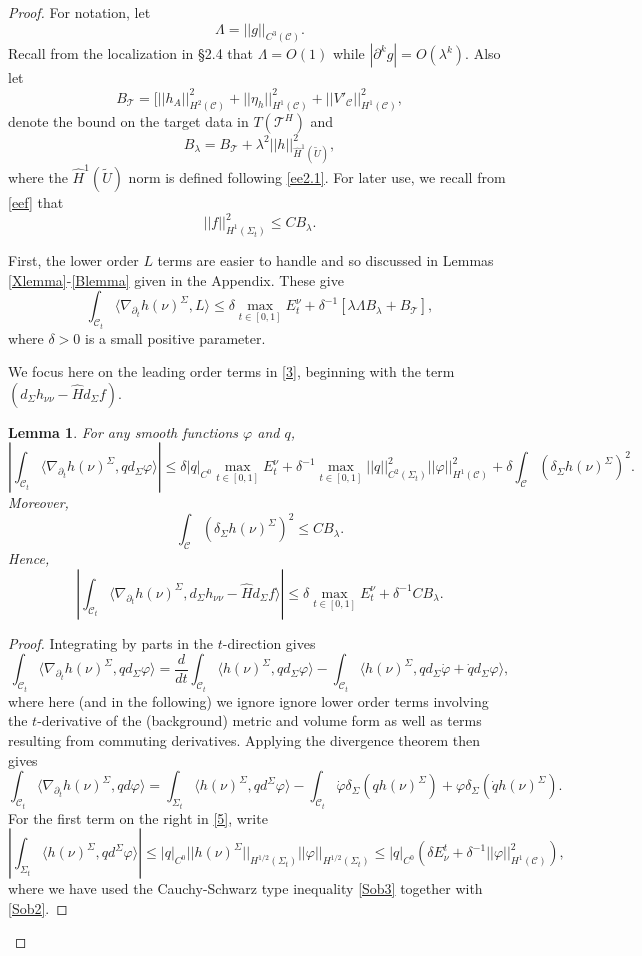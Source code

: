 \documentclass[10pt]{amsart}
\renewcommand{\d}{\delta}
\newcommand{\f}{\varphi}
\newcommand{\Si}{\Sigma}
\renewcommand{\l}{\lambda}
\newcommand{\cC}{{\mathcal C}}
\newcommand{\cT}{{\mathcal T}}
\newcommand{\be}{\begin{equation}}
\newcommand{\ee}{\end{equation}}
\newcommand{\p}{\partial}
\renewcommand{\hat}{\widehat}
\newcommand{\<}{\langle}
\renewcommand{\>}{\rangle}
\newcommand{\w}{\widetilde}
\theoremstyle{plain}
\newtheorem{lemma}{Lemma}[section]
\theoremstyle{remark}
\theoremstyle{definition}
\numberwithin{equation}{section}
\begin{document}
\begin{proof}
  \medskip 

For notation, let  
\be \label{Lambda}
\Lambda = ||g||_{C^3(\cC)}.
\ee
Recall from the localization in \S 2.4 that $\Lambda = O(1)$ while $|\p^k g| = O(\l^k)$. Also let 
\be \label{J} 
B_{\cT} = [||h_A||_{H^{2}(\cC)}^2 + ||\eta_h||_{H^1(\cC)}^2 + ||V'_{\cC}||_{H^1(\cC)}^2 , 
\ee
denote the bound on the target data in $T(\cT^H)$ and  
\be \label{Jeps} 
B_{\l} = B_{\cT} + \l^2 ||h||_{\hat H^1(\w U)}^2,
\ee
where the $\hat H^1(\w U)$ norm is defined following \eqref{ee2.1}. For later use, we recall from \eqref{eef} that 
\be \label{fJ}
||f||_{H^1(\Si_t)}^2 \leq C B_{\l}.
\ee

\medskip 

  First, the lower order $L$ terms are easier to handle and so discussed in Lemmas \ref{Xlemma}-\ref{Blemma} given in the Appendix. These give 
\be \label{Lower1}
\int_{\cC_t}\<\nabla_{\p_t} h(\nu)^{\Si}, L\> \leq \d \max_{t \in [0,1]}E_t ^{\nu}+ \d^{-1}[ \l \Lambda B_{\l} + B_{\cT}], 
\ee
where $\d > 0$ is a small positive parameter. 

   We focus here on the leading order terms in \eqref{3}, beginning with the term $(d_{\Si}h_{\nu \nu} - \hat H d_{\Si}f)$. 

\begin{lemma}\label{divlemma}
For any smooth functions $\f$ and $q$, 
\be \label{fq}
| \int_{\cC_t} \<\nabla_{\p_t} h(\nu)^{\Si}, qd_{\Si}\f\> | \leq \d |q|_{C^0}\max_{t\in [0,1]}E_t^{\nu} + \d^{-1}\max_{t\in [0,1]}||q||_{C^2(\Si_t)}^2 ||\f||_{H^1(\cC)}^2 + 
\d\int_{\cC}(\d_{\Si}h(\nu)^{\Si})^2.
\ee
Moreover, 
\be \label{div}
\int_{\cC}(\d_{\Si}h(\nu)^{\Si})^2  \leq C B_{\l}.
\ee 
Hence, 
\be \label{fq1}
| \int_{\cC_t} \<\nabla_{\p_t} h(\nu)^{\Si}, d_{\Si}h_{\nu \nu} - \hat H d_{\Si}f\> | \leq \d \max_{t\in [0,1]}E_t^{\nu} + \d^{-1} C B_{\l}.
\ee
\end{lemma}

\begin{proof} 
Integrating by parts in the $t$-direction gives 
$$\int_{\cC_t}\<\nabla_{\p_t} h(\nu)^{\Si}, q d_{\Si}\f \> = \frac{d}{dt}\int_{\cC_t}\<h(\nu)^{\Si}, q d_{\Si}\f\> - \int_{\cC_t}\<h(\nu)^{\Si}, q d_{\Si}\dot \f+ \dot q d_{\Si}\f\>,$$
where here (and in the following) we ignore ignore lower order terms involving the $t$-derivative of the (background) metric and volume form as well as 
terms resulting from commuting derivatives. Applying the divergence theorem then gives 
\be \label{5}
\int_{\cC_t}\<\nabla_{\p_t} h(\nu)^{\Si}, qd\f \> = \int_{\Si_t}\<h(\nu)^{\Si}, qd^{\Si}\f\> - \int_{\cC_t}\dot \f \d_{\Si}(q h(\nu)^{\Si}) + \f \d_{\Si}(\dot q h(\nu)^{\Si}). 
\ee 
For the first term on the right in \eqref{5}, write 
$$|\int_{\Si_t}\<h(\nu)^{\Si}, qd^{\Si}\f\>| \leq |q|_{C^0}||h(\nu)^{\Si}||_{H^{1/2}(\Si_t)}||\f||_{H^{1/2}(\Si_t)} \leq 
 |q|_{C^0}(\d E_{\nu}^t + \d^{-1} ||\f||_{H^{1}(\cC)}^2),$$  
where we have used the Cauchy-Schwarz type inequality \eqref{Sob3} together with \eqref{Sob2}. 


\end{proof}
\end{proof}
\end{document}

